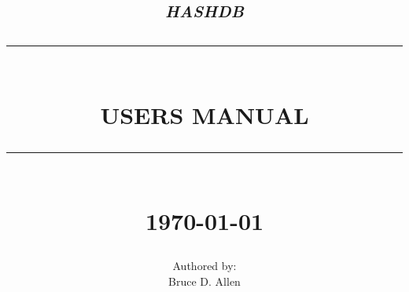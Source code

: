 \begin{titlepage}





%



\newcommand{\TRule}[1]{\rule{\linewidth}{#1}} 	%

\makeatletter							%
\def\printtitle{%
    {\centering \@title\par}}
\makeatother									

\makeatletter							%
\def\printauthor{%
    {\centering \large \@author}}				
\makeatother							

\title{	\LARGE \textsc{\textit{hashdb}} 	%
		 	\\[1.0cm]													%
			\TRule{0.5pt} \\										%
			\LARGE \textbf{\uppercase{Users Manual}}	%
			\TRule{2pt} \\ [0.5cm]								%
			\normalsize \today									%
		}
\author{
		Authored by: \\
		Bruce D. Allen\\
}

\thispagestyle{empty}				%

\printtitle									%
  	\vfill
\printauthor								%














\end{titlepage}
